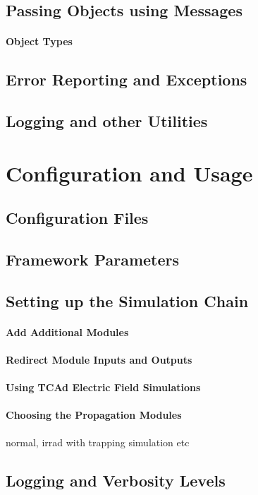 \documentclass{scrartcl}
\begin{document}
\subsection{Passing Objects using Messages}
\paragraph{Object Types}
\subsection{Error Reporting and Exceptions}
\subsection{Logging and other Utilities}

\section{Configuration and Usage}
\subsection{Configuration Files}
\subsection{Framework Parameters}
\subsection{Setting up the Simulation Chain}
\paragraph{Add Additional Modules}
\paragraph{Redirect Module Inputs and Outputs}
\paragraph{Using TCAd Electric Field Simulations}
\paragraph{Choosing the Propagation Modules}
normal, irrad with trapping simulation etc
\subsection{Logging and Verbosity Levels}
\end{document}

